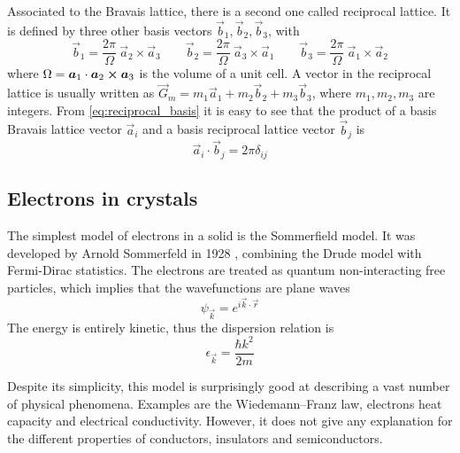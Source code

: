 Associated to the Bravais lattice, there is a second one called reciprocal lattice. It is defined by three other basis vectors $\vec{b}_1, \vec{b}_2, \vec{b}_3$, with
\begin{equation} \label{eq:reciprocal_basis}
    \vec{b}_1 = \frac{2\pi}{\Omega} \ \vec{a}_2 \times \vec{a}_3
    \qquad
    \vec{b}_2 = \frac{2\pi}{\Omega} \ \vec{a}_3 \times \vec{a}_1
    \qquad
    \vec{b}_3 = \frac{2\pi}{\Omega} \ \vec{a}_1 \times \vec{a}_2
\end{equation}
where $\Omega = \mathbf{\boldsymbol{a}}_1 \cdot \mathbf{\boldsymbol{a}}_2 \cross \mathbf{\boldsymbol{a}}_3$ is the volume of a unit cell. A vector in the reciprocal lattice is usually written as $\vec{G}_m = m_1\vec{a}_1 + m_2\vec{b}_2 + m_3\vec{b}_3$, where $m_1, m_2, m_3$ are integers. From \cref{eq:reciprocal_basis} it is easy to see that the product of a basis Bravais lattice vector $\vec{a}_i$ and a basis reciprocal lattice vector $\vec{b}_j$ is
\begin{equation}
    \vec{a}_i \cdot \vec{b}_j = 2\pi \delta_{ij}
\end{equation}

\subsection{Electrons in crystals} \label{sec:electrons}
The simplest model of electrons in a solid is the Sommerfield model. It was developed by Arnold Sommerfeld in 1928 \cite{sommerfeldZurElektronentheorieMetalle1928}, combining the Drude model \cite{drude1900a} with Fermi-Dirac statistics. The electrons are treated as quantum non-interacting free particles, which implies that the wavefunctions are plane waves
\begin{equation} \label{eq:plane_wave}
    \psi_\vec{k} = e^{i\vec{k}\cdot\vec{r}}
\end{equation}
The energy is entirely kinetic, thus the dispersion relation is
\begin{equation} \label{eq:free_dispersion}
    \epsilon_\vec{k} = \frac{\hbar k^2}{2m}
\end{equation}

Despite its simplicity, this model is surprisingly good at describing a vast number of physical phenomena. Examples are the Wiedemann–Franz law, electrons heat capacity and electrical conductivity. However, it does not give any explanation for the different properties of conductors, insulators and semiconductors.


